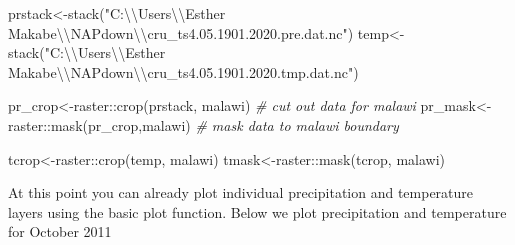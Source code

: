 \documentclass[
]{book}
\newenvironment{Shaded}{\begin{snugshade}}{\end{snugshade}}
\newcommand{\AttributeTok}[1]{\textcolor[rgb]{0.77,0.63,0.00}{#1}}
\newcommand{\CommentTok}[1]{\textcolor[rgb]{0.56,0.35,0.01}{\textit{#1}}}
\newcommand{\DecValTok}[1]{\textcolor[rgb]{0.00,0.00,0.81}{#1}}
\newcommand{\FloatTok}[1]{\textcolor[rgb]{0.00,0.00,0.81}{#1}}
\newcommand{\FunctionTok}[1]{\textcolor[rgb]{0.00,0.00,0.00}{#1}}
\newcommand{\NormalTok}[1]{#1}
\newcommand{\OtherTok}[1]{\textcolor[rgb]{0.56,0.35,0.01}{#1}}
\newcommand{\SpecialCharTok}[1]{\textcolor[rgb]{0.00,0.00,0.00}{#1}}
\newcommand{\StringTok}[1]{\textcolor[rgb]{0.31,0.60,0.02}{#1}}
\begin{document}
\begin{Shaded}
\begin{Highlighting}[]
\NormalTok{prstack}\OtherTok{\textless{}{-}}\FunctionTok{stack}\NormalTok{(}\StringTok{"C:}\SpecialCharTok{\textbackslash{}\textbackslash{}}\StringTok{Users}\SpecialCharTok{\textbackslash{}\textbackslash{}}\StringTok{Esther Makabe}\SpecialCharTok{\textbackslash{}\textbackslash{}}\StringTok{NAPdown}\SpecialCharTok{\textbackslash{}\textbackslash{}}\StringTok{cru\_ts4.05.1901.2020.pre.dat.nc"}\NormalTok{)}
\NormalTok{temp}\OtherTok{\textless{}{-}}\FunctionTok{stack}\NormalTok{(}\StringTok{"C:}\SpecialCharTok{\textbackslash{}\textbackslash{}}\StringTok{Users}\SpecialCharTok{\textbackslash{}\textbackslash{}}\StringTok{Esther Makabe}\SpecialCharTok{\textbackslash{}\textbackslash{}}\StringTok{NAPdown}\SpecialCharTok{\textbackslash{}\textbackslash{}}\StringTok{cru\_ts4.05.1901.2020.tmp.dat.nc"}\NormalTok{)}

\NormalTok{pr\_crop}\OtherTok{\textless{}{-}}\NormalTok{raster}\SpecialCharTok{::}\FunctionTok{crop}\NormalTok{(prstack, malawi) }\CommentTok{\# cut out data for malawi}
\NormalTok{pr\_mask}\OtherTok{\textless{}{-}}\NormalTok{raster}\SpecialCharTok{::}\FunctionTok{mask}\NormalTok{(pr\_crop,malawi) }\CommentTok{\# mask data to malawi boundary}

\NormalTok{tcrop}\OtherTok{\textless{}{-}}\NormalTok{raster}\SpecialCharTok{::}\FunctionTok{crop}\NormalTok{(temp, malawi)}
\NormalTok{tmask}\OtherTok{\textless{}{-}}\NormalTok{raster}\SpecialCharTok{::}\FunctionTok{mask}\NormalTok{(tcrop, malawi)}
\end{Highlighting}
\end{Shaded}

At this point you can already plot individual precipitation and temperature layers using the basic plot function. Below we plot precipitation and temperature for October 2011

\begin{Shaded}
\end{Shaded}
\end{document}
